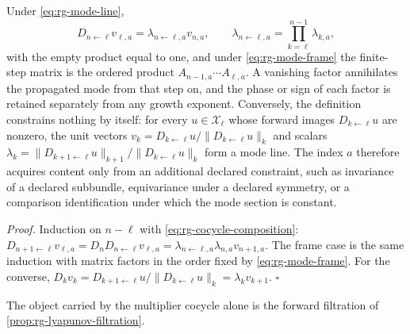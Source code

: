 Under \eqref{eq:rg-mode-line},
\begin{equation}
D_{n\leftarrow\ell}v_{\ell,a}=\lambda_{n\leftarrow\ell,a}v_{n,a},
\qquad
\lambda_{n\leftarrow\ell,a}=\prod_{k=\ell}^{n-1}\lambda_{k,a},
\label{eq:rg-mode-product}
\end{equation}
with the empty product equal to one, and under \eqref{eq:rg-mode-frame} the
finite-step matrix is the ordered product \(A_{n-1,a}\cdots A_{\ell,a}\). A
vanishing factor annihilates the propagated mode from that step on, and the
phase or sign of each factor is retained separately from any growth exponent.
Conversely, the definition constrains nothing by itself: for every
\(u\in \mathscr X_\ell\) whose forward images \(D_{k\leftarrow\ell}u\) are nonzero, the
unit vectors \(v_k=D_{k\leftarrow\ell}u/\lVert D_{k\leftarrow\ell}u\rVert_k\)
and scalars
\(\lambda_k=\lVert D_{k+1\leftarrow\ell}u\rVert_{k+1}/
\lVert D_{k\leftarrow\ell}u\rVert_k\) form a mode line. The index \(a\)
therefore acquires content only from an additional declared constraint, such
as invariance of a declared subbundle, equivariance under a declared symmetry,
or a comparison identification under which the mode section is constant.

\noindent\emph{Proof.}
Induction on \(n-\ell\) with \eqref{eq:rg-cocycle-composition}:
\(D_{n+1\leftarrow\ell}v_{\ell,a}=D_nD_{n\leftarrow\ell}v_{\ell,a}
=\lambda_{n\leftarrow\ell,a}\lambda_{n,a}v_{n+1,a}\). The frame case is the
same induction with matrix factors in the order fixed by
\eqref{eq:rg-mode-frame}. For the converse,
\(D_kv_k=D_{k+1\leftarrow\ell}u/\lVert D_{k\leftarrow\ell}u\rVert_k
=\lambda_kv_{k+1}\). \(\square\)

The object carried by the multiplier cocycle alone is the forward filtration
of \cref{prop:rg-lyapunov-filtration}.

